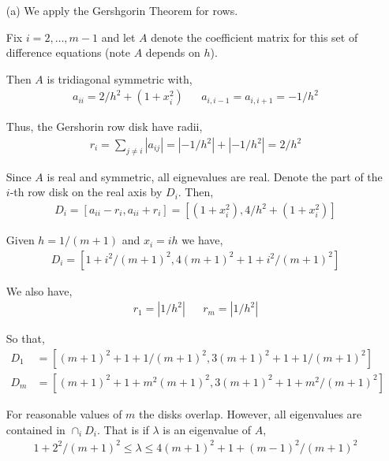 \documentclass[10pt]{article}
\begin{document}
\begin{solution}[Solution]

\begin{enumerate}
    \item[(a)] We apply the Gershgorin Theorem for rows. 


        Fix \( i=2,\ldots, m-1 \) and let \( A \) denote the coefficient matrix for this set  of difference equations (note \( A \) depends on \( h \)).

        Then \( A \) is tridiagonal symmetric with,
        \begin{align*}
            a_{ii} = 2/h^2 + (1+x_i^2) && a_{i,i-1} = a_{i,i+1} = -1/h^2
        \end{align*}

        Thus, the Gershorin row disk have radii,
        \begin{align*}
            r_i = \sum_{j\neq i} |a_{ij}| = |-1/h^2|+|-1/h^2| = 2/h^2
        \end{align*}
        
        Since \( A \) is real and symmetric, all eignevalues are real. Denote the part of the \( i \)-th row disk on the real axis by \( D_i \). Then,
        \begin{align*}
            D_i = [a_{ii}-r_i, a_{ii}+r_i] = [(1+x_i^2), 4/h^2+(1+x_i^2)]
        \end{align*}
        
        Given \( h = 1/(m+1) \) and \( x_i = ih \) we have,
        \begin{align*}
            D_i = [1+i^2/(m+1)^2, 4(m+1)^2+1+i^2/(m+1)^2]
        \end{align*}

        We also have,
        \begin{align*}
            r_1 = |1/h^2| && r_m = |1/h^2|
        \end{align*}

        So that,
        \begin{align*}
            D_1 &= [(m+1)^2+1+1/(m+1)^2,3(m+1)^2+1+1/(m+1)^2] 
            \\D_m &= [(m+1)^2+1+m^2(m+1)^2, 3(m+1)^2 +1+m^2/(m+1)^2]
        \end{align*}

        For reasonable values of \( m \) the disks overlap. However, all eigenvalues are contained in \( \cap_i D_i \). That is if \( \lambda \) is an eigenvalue of \( A \), 
        \begin{align*}
            1 + 2^2/(m+1)^2\leq \lambda \leq 4(m+1)^2 + 1 + (m-1)^2/(m+1)^2
        \end{align*}



\end{enumerate}
\end{solution}
\end{document}
